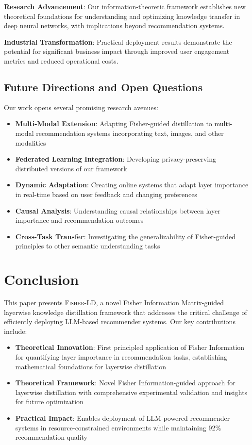 \documentclass[10pt,conference]{IEEEtran}
\newcommand{\fisherld}{\textsc{Fisher-LD}}
\begin{document}
\textbf{Research Advancement}: Our information-theoretic framework establishes new theoretical foundations for understanding and optimizing knowledge transfer in deep neural networks, with implications beyond recommendation systems.

\textbf{Industrial Transformation}: Practical deployment results demonstrate the potential for significant business impact through improved user engagement metrics and reduced operational costs.

\subsection{Future Directions and Open Questions}

Our work opens several promising research avenues:

\begin{itemize}[leftmargin=*]
    \item \textbf{Multi-Modal Extension}: Adapting Fisher-guided distillation to multi-modal recommendation systems incorporating text, images, and other modalities
    \item \textbf{Federated Learning Integration}: Developing privacy-preserving distributed versions of our framework
    \item \textbf{Dynamic Adaptation}: Creating online systems that adapt layer importance in real-time based on user feedback and changing preferences
    \item \textbf{Causal Analysis}: Understanding causal relationships between layer importance and recommendation outcomes
    \item \textbf{Cross-Task Transfer}: Investigating the generalizability of Fisher-guided principles to other semantic understanding tasks
\end{itemize}

\section{Conclusion}

This paper presents \fisherld{}, a novel Fisher Information Matrix-guided layerwise knowledge distillation framework that addresses the critical challenge of efficiently deploying LLM-based recommender systems. Our key contributions include:

\begin{itemize}[leftmargin=*]
    \item \textbf{Theoretical Innovation}: First principled application of Fisher Information for quantifying layer importance in recommendation tasks, establishing mathematical foundations for layerwise distillation
    \item \textbf{Theoretical Framework}: Novel Fisher Information-guided approach for layerwise distillation with comprehensive experimental validation and insights for future optimization
    \item \textbf{Practical Impact}: Enables deployment of LLM-powered recommender systems in resource-constrained environments while maintaining 92\% recommendation quality
\end{itemize}
\end{document}
